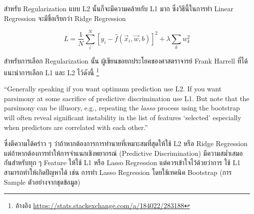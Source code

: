สำหรับ Regularization แบบ L2 นั้นก็จะมีความคล้ายกับ L1 มาก ซึ่งวิธีนี้ในการทำ Linear Regression จะมีชื่อเรียกว่า Ridge Regression

\begin{equation}
    L = \frac{1}{N}\sum_i^N \left[y_i - \hat{f}(\vec{x}_i, \vec{w}, b)\right]^2 + \lambda \sum_k w_k^2
\end{equation}

สำหรับการเลือก Regularization นั้น ผู้เขียนขอยกประโยคของศาสตราจารย์ Frank Harrell ที่ได้แนะนำการเลือก L1 และ L2 ไว้ดังนี้%
\footnote{อ้างอิง \url{https://stats.stackexchange.com/a/184022/283188}}

\begin{framed}
    \enquote{Generally speaking if you want optimum prediction use L2. 
    If you want parsimony at some sacrifice of predictive discrimination use L1. 
    But note that the parsimony can be illusory, e.g., repeating the \textit{lasso} 
    process using the bootstrap will often reveal significant instability 
    in the list of features \enquote{selected} especially when predictors are 
    correlated with each other.}
\end{framed}

ซึ่งตีความได้คร่าว ๆ ว่าถ้าหากต้องการการทำนายที่เหมาะสมที่สุดให้ใช้ L2 หรือ Ridge Regression แต่ถ้าหากต้องการทำให้การจำแนกเชิงพยากรณ์
(Predictive Discrimination) มีความสม่ำเสมอกันสำหรับทุก ๆ Feature ให้ใช้ L1 หรือ Lasso Regression แต่ควรเข้าใจไว้ด้วยว่าการ%
ใช้ L1 สามารถทำให้เกิดปัญหาได้ เช่น การทำ Lasso Regression โดยใช้เทคนิค Bootstrap (การ Sample ตัวอย่างจากชุดข้อมูล)
